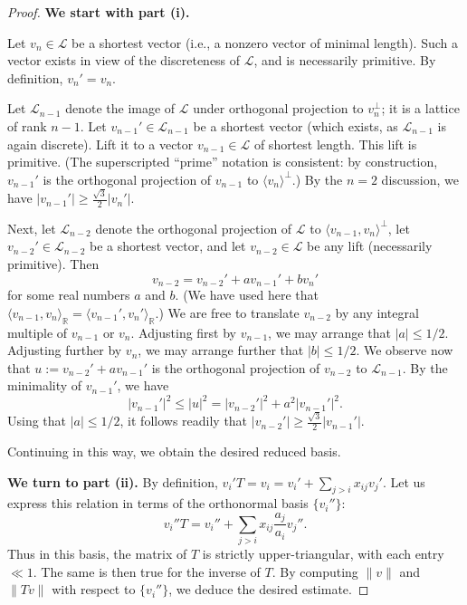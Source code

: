 \documentclass[reqno]{amsart} 
\begin{document}
\begin{proof}
  {\bf We start with part (i).}
  
  Let $v_n \in \mathcal{L}$ be a shortest vector (i.e., a nonzero vector of minimal length).  Such a vector exists in view of the discreteness of $\mathcal{L}$, and is necessarily primitive.  By definition, $v_n' = v_n$.
  

  Let $\mathcal{L}_{n-1}$ denote the image of $\mathcal{L}$ under orthogonal projection to $v_n^\perp$; it is a lattice of rank $n-1$.  Let $v_{n-1}' \in \mathcal{L}_{n-1}$ be a shortest vector (which exists, as $\mathcal{L}_{n-1}$ is again discrete).  Lift it to a vector $v_{n-1} \in \mathcal{L}$ of shortest length. This lift is primitive.  (The superscripted ``prime'' notation is consistent: by construction, $v_{n-1}'$ is the orthogonal projection of $v_{n-1}$ to $\langle v_n \rangle^\perp$.)  By the $n=2$ discussion, we have $|v_{n-1}'| \geq \frac{\sqrt{3}}{2} |v_n'|$.

  Next, let $\mathcal{L}_{n-2}$ denote the orthogonal projection of $\mathcal{L}$ to $\langle v_{n-1}, v_n \rangle^\perp$, let $v_{n-2}' \in \mathcal{L}_{n-2}$ be a shortest vector, and let $v_{n-2} \in \mathcal{L}$ be any lift (necessarily primitive).  Then
  \begin{equation*}
    v_{n-2} = v_{n-2}' + a v_{n-1}' + b v_n'
  \end{equation*}
  for some real numbers $a$ and $b$.  (We have used here that $\langle v_{n-1}, v_n \rangle_{\mathbb{R}} = \langle v_{n-1}', v_n' \rangle_{\mathbb{R}}$.)  We are free to translate $v_{n-2}$ by any integral multiple of $v_{n-1}$ or $v_n$.  Adjusting first by $v_{n-1}$, we may arrange that $|a| \leq 1/2$.  Adjusting further by $v_n$, we may arrange further that $|b| \leq 1/2$.  We observe now that $u := v_{n-2}' + a v_{n-1}'$ is the orthogonal projection of $v_{n-2}$ to $\mathcal{L}_{n-1}$.  By the minimality of $v_{n-1}'$, we have
  \begin{equation*}
    |v_{n-1}'|^2 \leq |u|^2 = |v_{n-2}'|^2 + a^2 | v_{n-1}'|^2.
  \end{equation*}
  Using that $|a| \leq 1/2$, it follows readily that $|v_{n-2}'| \geq \frac{\sqrt{3}}{2} | v_{n-1}'|$.

  Continuing in this way, we obtain the desired reduced basis.

  {\bf We turn to part (ii).}  By definition, $v_i ' T = v_i = v_i' + \sum_{j > i} x_{i j} v_j'$.  Let us express this relation in terms of the orthonormal basis $\{v_i''\}$:
  \begin{equation*}
    v_i'' T = v_i'' + \sum _{j > i } x_{i j} \frac{a_j}{a_i} v_j''.
  \end{equation*}
  Thus in this basis, the matrix of $T$ is strictly upper-triangular, with each entry $\ll 1$.  The same is then true for the inverse of $T$.  By computing $\|v\|$ and $\|T v\|$ with respect to $\{v_i''\}$, we deduce the desired estimate.


\end{proof}
\end{document}
